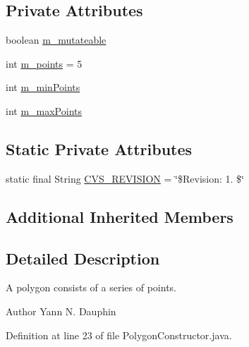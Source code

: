 \subsection*{Private Attributes}
\begin{DoxyCompactItemize}
\item 
boolean \hyperlink{classexamples_1_1gp_1_1monalisa_1_1core_1_1commands_1_1_polygon_constructor_afc5d6f3dbd5dabe1fab8d50b04decc67}{m\-\_\-mutateable}
\item 
int \hyperlink{classexamples_1_1gp_1_1monalisa_1_1core_1_1commands_1_1_polygon_constructor_a6268c0c301220754af8428f3e8cadfc2}{m\-\_\-points} = 5
\item 
int \hyperlink{classexamples_1_1gp_1_1monalisa_1_1core_1_1commands_1_1_polygon_constructor_adb7092709701ab2fccb359ec5148095d}{m\-\_\-min\-Points}
\item 
int \hyperlink{classexamples_1_1gp_1_1monalisa_1_1core_1_1commands_1_1_polygon_constructor_a614a93d1724bf9a12ec5b931e0502275}{m\-\_\-max\-Points}
\end{DoxyCompactItemize}
\subsection*{Static Private Attributes}
\begin{DoxyCompactItemize}
\item 
static final String \hyperlink{classexamples_1_1gp_1_1monalisa_1_1core_1_1commands_1_1_polygon_constructor_a9c1b3d3610d58b815d284aa556cad3ae}{C\-V\-S\-\_\-\-R\-E\-V\-I\-S\-I\-O\-N} = \char`\"{}\$Revision\-: 1. \$\char`\"{}
\end{DoxyCompactItemize}
\subsection*{Additional Inherited Members}


\subsection{Detailed Description}
A polygon consists of a series of points.

\begin{DoxyAuthor}{Author}
Yann N. Dauphin 
\end{DoxyAuthor}


Definition at line 23 of file Polygon\-Constructor.\-java.



